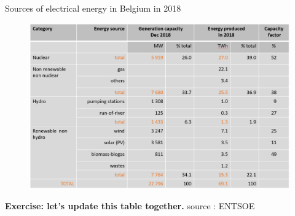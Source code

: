 \begin{frame}
{Sources of electrical energy in Belgium in 2018}
\begin{figure}
\centering
\includegraphics[width=\linewidth]{images/sources_BE.png}
\end{figure}
\vfill
\textbf{Exercise: let's update this table together.}
\vfill
\footnotesize{source : ENTSOE}
\end{frame}

